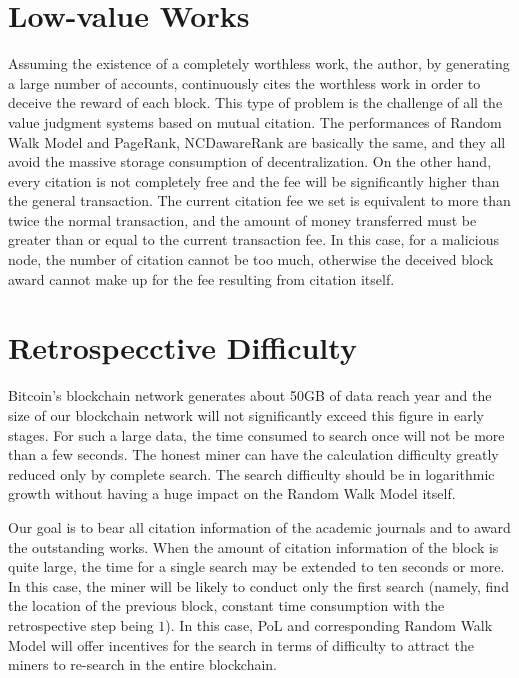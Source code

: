 \documentclass[a4paper,oneside,openany]{tufte-book}
\begin{document}
\section{Low-value Works}


Assuming the existence of a completely worthless work, the author, by generating a large number of accounts, continuously cites the worthless work in order to deceive the reward of each block. This type of problem is the challenge of all the value judgment systems based on mutual citation. The performances of Random Walk Model and PageRank, NCDawareRank are basically the same, and they all avoid the massive storage consumption of decentralization. On the other hand, every citation is not completely free and the fee will be significantly higher than the general transaction. The current citation fee we set is equivalent to more than twice the normal transaction, and the amount of money transferred must be greater than or equal to the current transaction fee. In this case, for a malicious node, the number of citation cannot be too much, otherwise the deceived block award cannot make up for the fee resulting from citation itself.




\section{Retrospecctive Difficulty}

Bitcoin’s blockchain network generates about 50GB of data reach year and the size of our blockchain network will not significantly exceed this figure in early stages. For such a large data, the time consumed to search once will not be more than a few seconds. The honest miner can have the calculation difficulty greatly reduced only by complete search. The search difficulty should be in logarithmic growth without having a huge impact on the Random Walk Model itself.



Our goal is to bear all citation information of the academic journals and to award the outstanding works. When the amount of citation information of the block is quite large, the time for a single search may be extended to ten seconds or more. In this case, the miner will be likely to conduct only the first search (namely, find the location of the previous block, constant time consumption with the retrospective step being $1$). In this case, PoL and corresponding Random Walk Model will offer incentives for the search in terms of difficulty to attract the miners to re-search in the entire blockchain.
\end{document}
